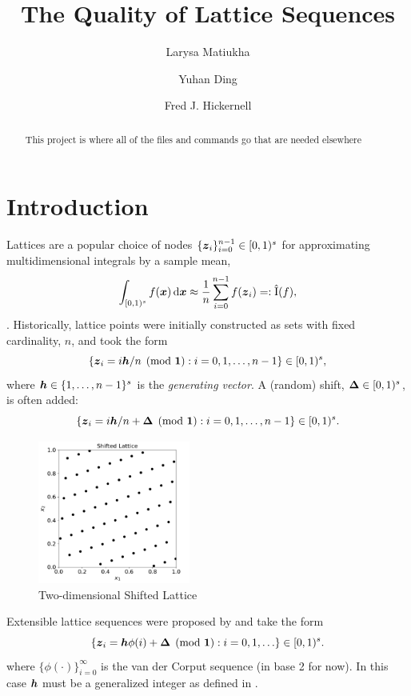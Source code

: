 \documentclass{amsart}
\DeclareMathOperator{\appxint}{\hat{I}}
\begin{document}
\title{The Quality of Lattice Sequences}
\author{Larysa Matiukha}
\author{Yuhan Ding}
\author{Fred J. Hickernell}
\begin{abstract}This project is where all of the files and commands go that are needed elsewhere
\end{abstract}

\maketitle

\section{Introduction}
Lattices are a popular choice of nodes $\{\boldsymbol{z}_i\}_{i=0}^{n-1} \in [0,1)^s$ for approximating multidimensional integrals by a sample mean,
\[ 
\int_{[0,1)^s} f(\vx) \, \dif \vx \approx \frac{1}{n} \sum_{i=0}^{n-1} f(\vz_i) =:\appxint(f),
\]
\cite{DicEtal22a,Nie92,SloJoe94}.  
Historically, lattice points were initially constructed as sets with fixed cardinality, $n$, and took the form
\begin{equation} \label{eq:lat}
    \{\boldsymbol{z}_i = i \boldsymbol{h}/n \pmod{\boldsymbol{1}} : i=0,1, \ldots, n-1 \} \in [0,1)^s,
\end{equation}
where $\boldsymbol{h} \in \{1, \ldots, n-1\}^s$ is the \emph{generating vector}.  A (random) shift, $\boldsymbol{\Delta} \in [0,1)^s$, is often added:
\begin{equation} \label{eq:shlat}
    \{\boldsymbol{z}_i = i \boldsymbol{h}/n + \boldsymbol{\Delta} \pmod{\boldsymbol{1}} : i=0,1, \ldots, n-1 \} \in [0,1)^s.
\end{equation}

\begin{figure}[h]
\includegraphics[width=5cm,trim={0 0 0 7.5mm},clip]{shifted-lattice}
\caption{Two-dimensional Shifted Lattice}
\label{fig:enter-label}
\end{figure}



Extensible lattice sequences were proposed by \cite{HicEtal00,Mai81a} and take the form
\begin{equation} \label{eq:extlat}
    \{\boldsymbol{z}_i = \boldsymbol{h}\phi(i)+ \boldsymbol{\Delta} \pmod{\boldsymbol{1}} : i=0,1, \ldots \} \in [0,1)^s.
\end{equation}
where $\{\phi(\cdot)\}_{i=0}^\infty$ is the van der Corput sequence (in base 2 for now).  In this case $\boldsymbol{h}$ must be a generalized integer as defined in \cite[Section 2]{HicNie03a}.
\end{document}

